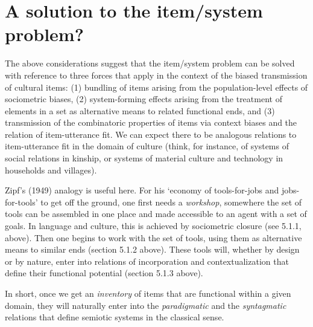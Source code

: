 \section{A solution to the item/system problem?}


The above considerations suggest that the item/system problem can be 
solved with reference to three forces that apply in the context of the 
biased transmission of cultural items: (1) bundling of items arising 
from the population-level effects of sociometric biases, (2) 
system-forming effects arising from the treatment of elements in a set 
as alternative means to related functional ends, and (3) transmission of 
the combinatoric properties of items via context biases and the relation 
of item-utterance fit. We can expect there to be analogous relations to 
item-utterance fit in the domain of culture (think, for instance, of 
systems of social relations in kinship, or systems of material culture 
and technology in households and villages). 



Zipf's (1949) analogy is useful here. For his \textquoteleft economy of tools-for-jobs 
and jobs-for-tools' to get off the ground, one first needs a \textit{
workshop}, somewhere the set of tools can be assembled in one place 
and made accessible to an agent with a set of goals. In language and 
culture, this is achieved by sociometric closure (see 5.1.1, above). 
Then one begins to work with the set of tools, using them as alternative 
means to similar ends (section 5.1.2 above). These tools will, whether 
by design or by nature, enter into relations of incorporation and 
contextualization that define their functional potential (section 5.1.3 
above). 



In short, once we get an \textit{inventory} of items that are 
functional within a given domain, they will naturally enter into the 
\textit{paradigmatic} and the \textit{syntagmatic} relations that 
define semiotic systems in the classical sense.









\newpage


\newpage